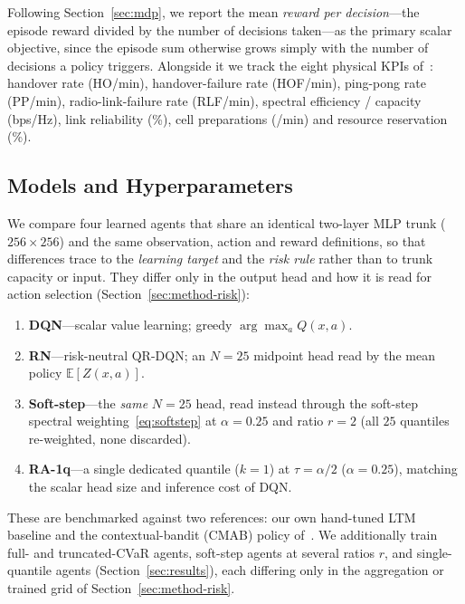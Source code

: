 \documentclass[conference]{IEEEtran}
\begin{document}
Following Section~\ref{sec:mdp}, we report the mean \emph{reward per decision}---the
episode reward divided by the number of decisions taken---as the primary scalar
objective, since the episode sum otherwise grows simply with the number of
decisions a policy triggers. Alongside it we track the eight physical KPIs
of~\cite{cmab_ho}: handover rate (HO/min), handover-failure rate (HOF/min),
ping-pong rate (PP/min), radio-link-failure rate (RLF/min), spectral efficiency /
capacity (bps/Hz), link reliability (\%), cell preparations (/min) and resource
reservation (\%).

\subsection{Models and Hyperparameters}
\label{sec:models}

We compare four learned agents that share an identical two-layer MLP trunk
($256\times256$) and the same observation, action and reward definitions, so that
differences trace to the \emph{learning target} and the \emph{risk rule} rather
than to trunk capacity or input. They differ only in the output head and how it
is read for action selection (Section~\ref{sec:method-risk}):
\begin{enumerate}
    \item \textbf{DQN}---scalar value learning; greedy $\arg\max_a Q(x,a)$.
    \item \textbf{RN}---risk-neutral QR-DQN; an $N{=}25$ midpoint head read by the
    mean policy $\mathbb{E}[Z(x,a)]$.
    \item \textbf{Soft-step}---the \emph{same} $N{=}25$ head, read instead through
    the soft-step spectral weighting~\eqref{eq:softstep} at $\alpha{=}0.25$ and
    ratio $r{=}2$ (all $25$ quantiles re-weighted, none discarded).
    \item \textbf{RA-1q}---a single dedicated quantile ($k{=}1$) at
    $\tau{=}\alpha/2$ ($\alpha{=}0.25$), matching the scalar head size and
    inference cost of DQN.
\end{enumerate}
These are benchmarked against two references: our own hand-tuned LTM baseline and
the contextual-bandit (CMAB) policy of~\cite{cmab_ho}. We additionally train full- and truncated-CVaR agents,
soft-step agents at several ratios $r$, and single-quantile agents
(Section~\ref{sec:results}), each differing only in the aggregation or trained
grid of Section~\ref{sec:method-risk}.
\end{document}
